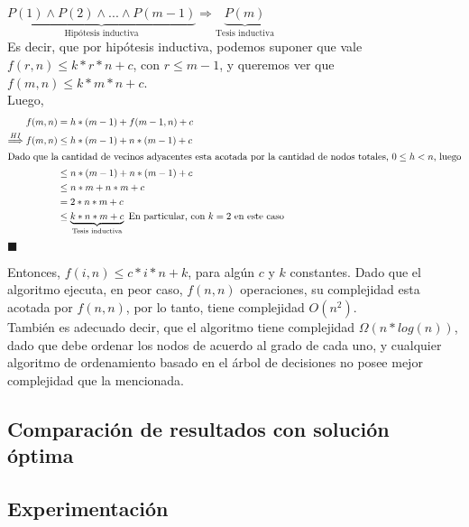 $\underbrace{P(1) \wedge P(2) \wedge ... \wedge P(m-1)}_{\text{Hipótesis inductiva}} \Rightarrow \underbrace{P(m)}_{\text{Tesis inductiva}}$\\

Es decir, que por hipótesis inductiva, podemos suponer que vale $f(r,n) \leq k*r*n + c$, con $r \leq m-1$, y queremos ver que $f(m,n) \leq k*m*n + c$.\\
Luego,
\begin{align*}
f(m,n) & = h*(m-1) + f(m-1,n) + c \\
 \stackrel{HI}{\Longrightarrow} f(m,n) & \leq h*(m-1) + n*(m-1) + c \\
 \intertext{Dado que la cantidad de vecinos adyacentes esta acotada por la cantidad de nodos totales, $0 \leq h < n$, luego}
 & \leq n*(m-1)+n*(m-1) + c\\
 & \leq n*m + n*m + c\\
 & = 2*n*m + c\\
 & \leq \underbrace{k*n*m + c}_{\text{Tesis inductiva}} \text{       En particular, con $k = 2$ en este caso}
\end{align*}
\hfill $\blacksquare$

Entonces, $f(i,n) \leq c*i*n + k$, para algún $c$ y $k$ constantes.
Dado que el algoritmo ejecuta, en peor caso, $f(n,n)$ operaciones, su complejidad esta acotada por $f(n,n)$, por lo tanto, tiene complejidad $O(n^{2})$.\\

También es adecuado decir, que el algoritmo tiene complejidad $\Omega(n*log(n))$, dado que debe ordenar los nodos de acuerdo al grado de cada uno, y cualquier algoritmo de ordenamiento basado en el árbol de decisiones no posee mejor complejidad que la mencionada.

\subsection{Comparaci\'on de resultados con soluci\'on \'optima}
\subsection{Experimentaci\'on}
